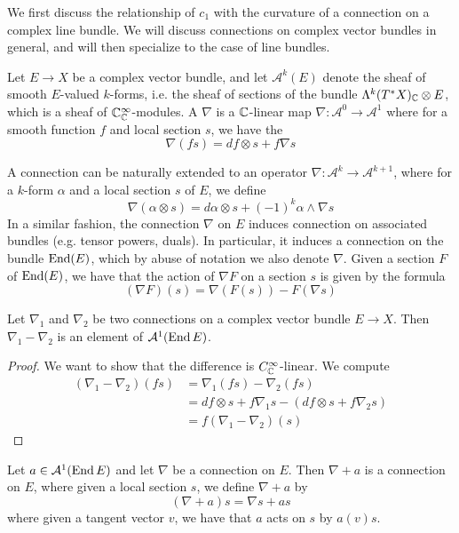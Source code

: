 We first discuss the relationship of $c_1$ with the curvature of a connection on
a complex line bundle. We will discuss connections on complex vector bundles in
general, and will then specialize to the case of line bundles.
%
\begin{defn}
Let $E \to X$ be a complex vector bundle, and let $\mathcal{A}^k(E)$ denote the
sheaf of smooth $E$-valued $k$-forms, i.e. the sheaf of sections of the bundle
$\Lambda^k(T^*X)_{\mathbb{C}} \otimes E$, which is a sheaf of $\mathbb{C}^\infty_{\mathbb{C}}$-modules. A
 $\nabla$ is a $\mathbb{C}$-linear map
$\nabla : \mathcal{A}^0 \to \mathcal{A}^1$
where for a smooth function $f$ and local section $s$, we have the 
\[
\nabla(fs) = df \otimes s + f\nabla s
\]
\end{defn}
%
A connection can be naturally extended to an operator
$\nabla : \mathcal{A}^k \to \mathcal{A}^{k+1}$, where for a $k$-form $\alpha$
and a local section $s$ of $E$, we define
\[
\nabla(\alpha \otimes s) = d\alpha \otimes s + (-1)^k \alpha \wedge \nabla s
\]
In a similar fashion, the connection $\nabla$ on $E$ induces connection on associated
bundles (e.g. tensor powers, duals). In particular, it induces a connection on the bundle
$\operatorname{End}(E)$, which by abuse of notation we also denote $\nabla$. Given a section $F$ of
$\operatorname{End}(E)$, we have that the action of $\nabla F$ on a section $s$ is given by the formula
\[
(\nabla F)(s) = \nabla(F(s)) - F(\nabla s)
\]
\begin{prop}
Let $\nabla_1$ and $\nabla_2$ be two connections on a complex vector bundle
$E \to X$. Then $\nabla_1 - \nabla_2$ is an element of $\mathcal{A}^1(\operatorname{End} E)$.
\end{prop}
%
\begin{proof}
We want to show that the difference is $C^\infty_{\mathbb{C}}$-linear. We compute
\begin{align*}
(\nabla_1 - \nabla_2)(fs) &= \nabla_1(fs) - \nabla_2(fs) \\
&= df \otimes s + f\nabla_1s - (df \otimes s + f\nabla_2s) \\
&= f(\nabla_1 - \nabla_2)(s)
\end{align*}
\end{proof}
%
\begin{prop}
Let $a \in \mathcal{A}^1(\operatorname{End} E)$ and let $\nabla$ be a connection on $E$. Then
$\nabla + a$ is a connection on $E$, where given a local
section $s$, we define $\nabla + a$ by
\[
(\nabla + a)s = \nabla s + as
\]
where given a tangent vector $v$, we have that $a$ acts on $s$ by $a(v)s$.
\end{prop}
